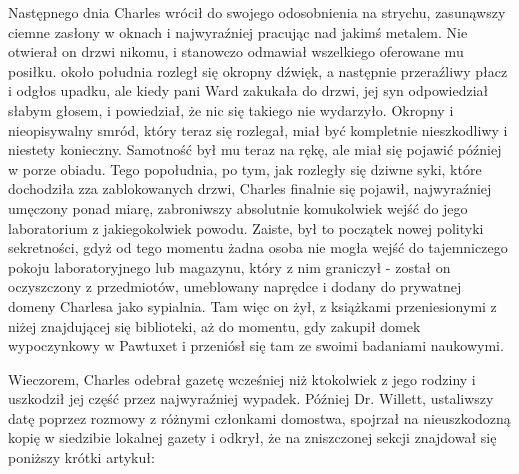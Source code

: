 Następnego dnia Charles wrócił do swojego odosobnienia na strychu,  zasunąwszy ciemne zasłony w oknach i najwyraźniej pracując nad jakimś metalem. Nie otwierał on drzwi nikomu, i stanowczo odmawiał wszelkiego oferowane mu posiłku. około południa rozległ się okropny dźwięk, a następnie przeraźliwy płacz i odgłos upadku, ale kiedy pani Ward zakukała do drzwi, jej syn odpowiedział słabym głosem, i powiedział, że nic się takiego nie wydarzyło. Okropny i nieopisywalny smród, który teraz się rozlegał, miał być kompletnie nieszkodliwy i niestety konieczny. Samotność był mu teraz na rękę, ale miał się pojawić później w porze obiadu. Tego popołudnia, po tym, jak rozległy się dziwne syki, które dochodziła zza zablokowanych drzwi, Charles finalnie się pojawił, najwyraźniej umęczony ponad miarę, zabroniwszy absolutnie komukolwiek wejść do jego laboratorium z jakiegokolwiek powodu. Zaiste, był to początek nowej polityki sekretności, gdyż od tego momentu żadna osoba nie mogła wejść do tajemniczego pokoju laboratoryjnego lub magazynu, który z nim graniczył - został on oczyszczony z przedmiotów, umeblowany naprędce i dodany do prywatnej domeny Charlesa jako sypialnia. Tam więc on żył, z książkami przeniesionymi z niżej znajdującej się biblioteki, aż do momentu, gdy zakupił domek wypoczynkowy w Pawtuxet i przeniósł się tam ze swoimi badaniami naukowymi. 

Wieczorem, Charles odebrał gazetę wcześniej niż ktokolwiek z jego rodziny i uszkodził jej część przez najwyraźniej wypadek. Później Dr. Willett, ustaliwszy datę poprzez rozmowy z różnymi członkami domostwa, spojrzał na nieuszkodozną kopię w siedzibie lokalnej gazety i odkrył, że na zniszczonej sekcji znajdował się poniższy krótki artykuł:

